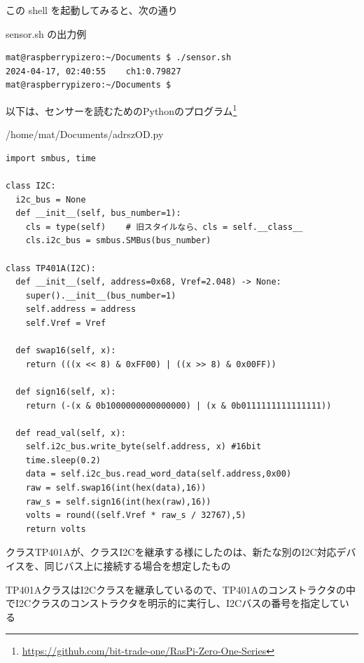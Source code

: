 \documentclass[12pt,a4j]{jsbook}
\begin{document}
この shell を起動してみると、次の通り

\begin{spacing}{0.95}
\begin{itembox}[l]{sensor.sh の出力例}
\begin{verbatim}
mat@raspberrypizero:~/Documents $ ./sensor.sh
2024-04-17, 02:40:55	ch1:0.79827
mat@raspberrypizero:~/Documents $
\end{verbatim}
\end{itembox}
\end{spacing}

\newpage

以下は、センサーを読むためのPythonのプログラム\footnote{\url{https://github.com/bit-trade-one/RasPi-Zero-One-Series}
}

\begin{spacing}{0.9}
\begin{itembox}[l]{/home/mat/Documents/adrszOD.py}
\begin{verbatim}
import smbus, time

class I2C:
  i2c_bus = None
  def __init__(self, bus_number=1):
    cls = type(self)    # 旧スタイルなら、cls = self.__class__
    cls.i2c_bus = smbus.SMBus(bus_number)

class TP401A(I2C):
  def __init__(self, address=0x68, Vref=2.048) -> None:
    super().__init__(bus_number=1)
    self.address = address
    self.Vref = Vref

  def swap16(self, x):
    return (((x << 8) & 0xFF00) | ((x >> 8) & 0x00FF))

  def sign16(self, x):
    return (-(x & 0b1000000000000000) | (x & 0b0111111111111111))

  def read_val(self, x):
    self.i2c_bus.write_byte(self.address, x) #16bit
    time.sleep(0.2)
    data = self.i2c_bus.read_word_data(self.address,0x00)
    raw = self.swap16(int(hex(data),16))
    raw_s = self.sign16(int(hex(raw),16))
    volts = round((self.Vref * raw_s / 32767),5)
    return volts
\end{verbatim}
\end{itembox}
\end{spacing}


クラスTP401Aが、クラスI2Cを継承する様にしたのは、新たな別のI2C対応デバイスを、同じバス上に接続する場合を想定したもの

TP401AクラスはI2Cクラスを継承しているので、TP401Aのコンストラクタの中でI2Cクラスのコンストラクタを明示的に実行し、I2Cバスの番号を指定している
\end{document}
